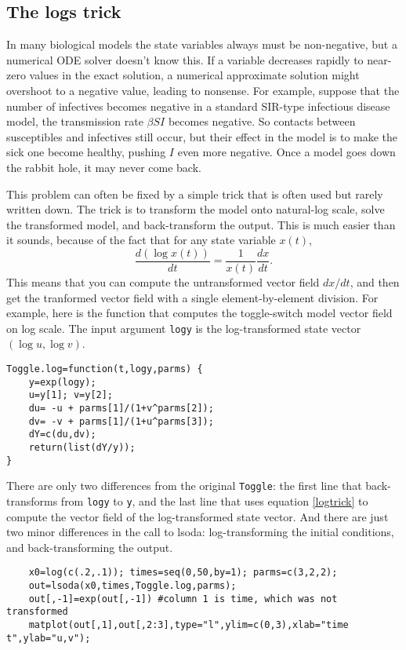 \documentclass [11pt]{article}
\newcommand{\blst}{\vspace{-0.035in} \begin{lstlisting}}
\newcommand{\ttt}[1]{\texttt{#1}}
\numberwithin{exercise}{section}
\begin{document}
\subsection{The logs trick}
In many biological models the state variables always must be non-negative, but 
a numerical ODE solver doesn't know this. If a variable decreases rapidly to near-zero 
values in the exact solution, a numerical approximate solution might overshoot to a 
negative value, leading to nonsense. For example, suppose that the number of infectives becomes
negative in a standard SIR-type infectious disease model, the transmission rate $\beta SI$ becomes 
negative. So contacts between susceptibles and infectives still occur, but their effect in the 
model is to make the sick one become healthy, pushing $I$ even more negative. Once a model goes
down the rabbit hole, it may never come back.  
  
This problem can often be fixed by a simple trick that is 
often used but rarely written down. The trick is to 
transform the model onto natural-log scale, solve the transformed model, and back-transform 
the output. This is much easier than it sounds, because of the fact that for any state variable
$x(t)$,  
\begin{equation}
\frac{d(\log x(t))}{dt} = \frac{1}{x(t)}\frac{dx}{dt}. 
\label{logtrick}
\end{equation}
This means that you can compute the untransformed vector field $dx/dt$, and then get
the tranformed vector field with a single element-by-element division. 
For example, here is the function that computes the toggle-switch model vector field 
on log scale. The input argument \ttt{logy} is the log-transformed state vector $(\log u, \log v)$.   
\blst
Toggle.log=function(t,logy,parms) {
	y=exp(logy); 
	u=y[1]; v=y[2];
	du= -u + parms[1]/(1+v^parms[2]);
	dv= -v + parms[1]/(1+u^parms[3]);
	dY=c(du,dv); 
	return(list(dY/y)); 
}
\end{lstlisting} 
There are only two differences from the original \ttt{Toggle}: the first line that
back-transforms from \ttt{logy} to \ttt{y}, and the last line that uses equation
\eqref{logtrick} to compute the vector field of the log-transformed state vector.  
And there are just two minor differences in the call to lsoda: log-transforming
the initial conditions, and back-transforming the output. 
\blst
    x0=log(c(.2,.1)); times=seq(0,50,by=1); parms=c(3,2,2);
    out=lsoda(x0,times,Toggle.log,parms);
    out[,-1]=exp(out[,-1]) #column 1 is time, which was not transformed 
    matplot(out[,1],out[,2:3],type="l",ylim=c(0,3),xlab="time t",ylab="u,v"); 
\end{lstlisting}
\end{document}
